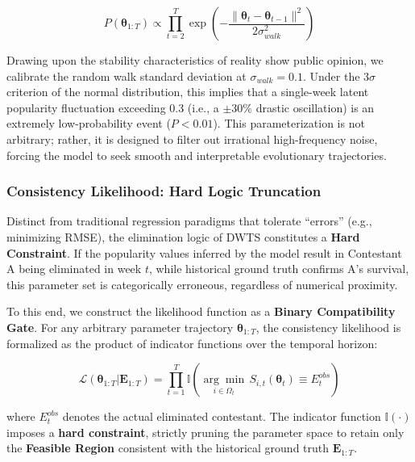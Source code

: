 \documentclass{mcmthesis}
\begin{document}
\begin{equation}
	P(\boldsymbol{\theta}_{1:T}) \propto \prod_{t=2}^{T} \exp \left( - \frac{\| \boldsymbol{\theta}_t - \boldsymbol{\theta}_{t-1} \|^2}{2\sigma_{walk}^2} \right)
	\label{eq:smoothness_prior}
\end{equation}

\noindent Drawing upon the stability characteristics of reality show public opinion, we calibrate the random walk standard deviation at $\sigma_{walk} = 0.1$. Under the $3\sigma$ criterion of the normal distribution, this implies that a single-week latent popularity fluctuation exceeding 0.3 (i.e., a $\pm 30\%$ drastic oscillation) is an extremely low-probability event ($P < 0.01$). This parameterization is not arbitrary; rather, it is designed to filter out irrational high-frequency noise, forcing the model to seek smooth and interpretable evolutionary trajectories.

\subsubsection{Consistency Likelihood: Hard Logic Truncation}

Distinct from traditional regression paradigms that tolerate ``errors'' (e.g., minimizing RMSE), the elimination logic of DWTS constitutes a \textbf{Hard Constraint}. If the popularity values inferred by the model result in Contestant A being eliminated in week $t$, while historical ground truth confirms A's survival, this parameter set is categorically erroneous, regardless of numerical proximity.

To this end, we construct the likelihood function as a \textbf{Binary Compatibility Gate}. For any arbitrary parameter trajectory $\boldsymbol{\theta}_{1:T}$, the consistency likelihood is formalized as the product of indicator functions over the temporal horizon:

\begin{equation}
	\mathcal{L}(\boldsymbol{\theta}_{1:T} | \mathbf{E}_{1:T}) = \prod_{t=1}^{T} \mathbb{I} \left( \underset{i \in \Omega_t}{\arg\min} \, S_{i,t}(\boldsymbol{\theta}_t) \equiv E^{obs}_t \right)
	\label{eq:logical_scalpel}
\end{equation}

\noindent where $E^{obs}_t$ denotes the actual eliminated contestant. The indicator function $\mathbb{I}(\cdot)$ imposes a \textbf{hard constraint}, strictly pruning the parameter space to retain only the \textbf{Feasible Region} consistent with the historical ground truth $\mathbf{E}_{1:T}$.
\end{document}
